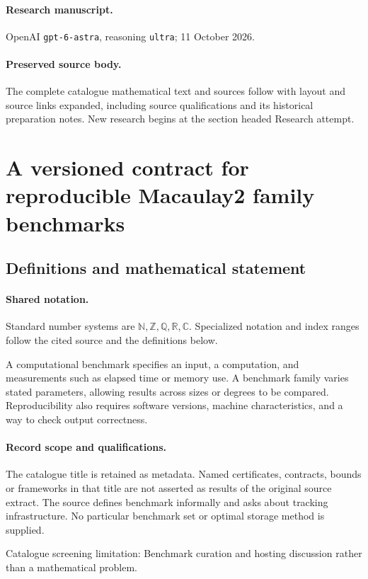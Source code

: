 \documentclass[11pt]{article}
\begin{document}
\paragraph{Research manuscript.} OpenAI \texttt{gpt-6-astra}, reasoning \texttt{ultra}; 11 October 2026.
\paragraph{Preserved source body.} The complete catalogue mathematical text and sources follow with layout and source links expanded, including source qualifications and its historical preparation notes. New research begins at the section headed Research attempt.

\section{A versioned contract for reproducible Macaulay2 family benchmarks}\label{statement}

\subsection{Definitions and mathematical statement}

\paragraph{Shared notation.}Standard number systems are $\mathbb N,\mathbb Z,\mathbb Q,\mathbb R,\mathbb C$. Specialized notation and index ranges follow the cited source and the definitions below.


A computational benchmark specifies an input, a computation, and measurements such as elapsed time or memory use. A benchmark family varies stated parameters, allowing results across sizes or degrees to be compared. Reproducibility also requires software versions, machine characteristics, and a way to check output correctness.
\paragraph{Record scope and qualifications.}
The catalogue title is retained as metadata. Named certificates, contracts, bounds or frameworks in that title are not asserted as results of the original source extract.
The source defines benchmark informally and asks about tracking infrastructure. No particular benchmark set or optimal storage method is supplied.

Catalogue screening limitation: Benchmark curation and hosting discussion rather than a mathematical problem.
\end{document}

